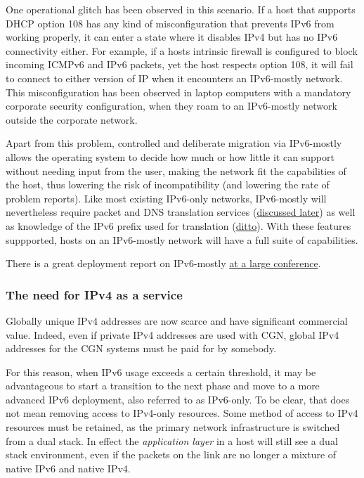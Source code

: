 \documentclass[
]{article}
\begin{document}
One operational glitch has been observed in this scenario. If a host
that supports DHCP option 108 has any kind of misconfiguration that
prevents IPv6 from working properly, it can enter a state where it
disables IPv4 but has no IPv6 connectivity either. For example, if a
host\textquotesingle s intrinsic firewall is configured to block
incoming ICMPv6 and IPv6 packets, yet the host respects option 108, it
will fail to connect to either version of IP when it encounters an
IPv6-mostly network. This misconfiguration has been observed in laptop
computers with a mandatory corporate security configuration, when they
roam to an IPv6-mostly network outside the corporate network.

Apart from this problem, controlled and deliberate migration via
IPv6-mostly allows the operating system to decide how much or how little
it can support without needing input from the user, making the network
fit the capabilities of the host, thus lowering the risk of
incompatibility (and lowering the rate of problem reports). Like most
existing IPv6-only networks, IPv6-mostly will nevertheless require
packet and DNS translation services
(\hyperref[translation-and-ipv4-as-a-service]{discussed later}) as well
as knowledge of the IPv6 prefix used for translation
(\hyperref[translation-and-ipv4-as-a-service]{ditto}). With these
features suppported, hosts on an IPv6-mostly network will have a full
suite of capabilities.

There is a great deployment report on IPv6-mostly
\href{https://nsrc.org/blog/apricot-ipv6-only}{at a large conference}.

\subsubsection{The need for IPv4 as a
service}\label{the-need-for-ipv4-as-a-service}

Globally unique IPv4 addresses are now scarce and have significant
commercial value. Indeed, even if private IPv4 addresses are used with
CGN, global IPv4 addresses for the CGN systems must be paid for by
somebody.

For this reason, when IPv6 usage exceeds a certain threshold, it may be
advantageous to start a transition to the next phase and move to a more
advanced IPv6 deployment, also referred to as IPv6-only. To be clear,
that does not mean removing access to IPv4-only resources. Some method
of access to IPv4 resources must be retained, as the primary network
infrastructure is switched from a dual stack. In effect the
\emph{application layer} in a host will still see a dual stack
environment, even if the packets on the link are no longer a mixture of
native IPv6 and native IPv4.
\end{document}
